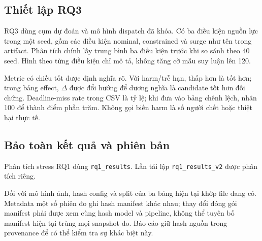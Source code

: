 \subsection{Thiết lập RQ3}
RQ3 dùng cụm dự đoán và mô hình dispatch đã khóa. Có ba điều kiện nguồn lực trong một seed, gồm các điều kiện nominal, constrained và surge như tên trong artifact. Phân tích chính lấy trung bình ba điều kiện trước khi so sánh theo 40 seed. Hình theo từng điều kiện chỉ mô tả, không tăng cỡ mẫu suy luận lên 120.

Metric có chiều tốt được định nghĩa rõ. Với harm/trễ hạn, thấp hơn là tốt hơn; trong bảng effect, $\Delta$ được đổi hướng để dương nghĩa là candidate tốt hơn đối chứng. Deadline-miss rate trong CSV là tỷ lệ; khi đưa vào bảng chênh lệch, nhân 100 để thành điểm phần trăm. Không gọi biến harm là số người chết hoặc thiệt hại thực tế.

\subsection{Bảo toàn kết quả và phiên bản}
Phân tích stress RQ1 dùng \texttt{rq1\_results}. Lần tái lập \texttt{rq1\_results\_v2} được phân tích riêng.

Đối với mô hình ảnh, hash config và split của ba bảng hiện tại khớp file đang có. Metadata một số phiên đo ghi hash manifest khác nhau; thay đổi đóng gói manifest phải được xem cùng hash model và pipeline, không thể tuyên bố manifest hiện tại trùng mọi snapshot đo. Báo cáo giữ hash nguồn trong provenance để có thể kiểm tra sự khác biệt này.
